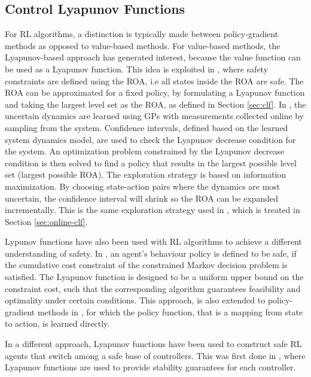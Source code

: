 \documentclass[3p,times,procedia]{elsarticle}
\begin{document}
\subsection{Control Lyapunov Functions}\label{sec:rl-clf}
For RL algorithms, a distinction is typically made between policy-gradient methods as opposed to value-based methods. For value-based methods, the Lyapunov-based approach has generated interest, because the value function can be used as a Lyapunov function. This idea is exploited in \cite{Berkenkamp2017}, where safety constraints are defined using the ROA, i.e all states inside the ROA are safe. The ROA can be approximated for a fixed policy, by formulating a Lyapunov function and taking the largest level set as the ROA, as defined in Section \ref{sec:clf}. In \cite{Berkenkamp2017}, the uncertain dynamics are learned using GPs with measurements collected online by sampling from the system. Confidence intervals, defined based on the learned system dynamics model, are used to check the Lyapunov decrease condition for the system. An optimization problem constrained by the Lyapunov decrease condition is then solved to find a policy that results in the largest possible level set (largest possible ROA). The exploration strategy is based on information maximization. By choosing state-action pairs where the dynamics are most uncertain, the confidence interval will shrink so the ROA can be expanded incrementally. This is the same exploration strategy used in \cite{Berkenkamp2016}, which is treated in Section \ref{sec:online-clf}. 


Lypunov functions have also been used with RL algorithms to achieve a different understanding of safety. In \cite{Chow2018}, an agent's behaviour policy is defined to be safe, if the cumulative cost constraint of the constrained Markov decision problem is satisfied. The Lyapunov function is designed to be a uniform upper bound on the constraint cost, such that the corresponding algorithm guarantees feasibility and optimality under certain conditions. This approach, is also extended to policy-gradient methods in \cite{Chow2019}, for which the policy function, that is a mapping from state to action, is learned directly.

In a different approach, Lyapunov functions have been used to construct safe RL agents that switch among a safe base of controllers. This was first done in \cite{Perkins2003}, where Lyapunov functions are used to provide stability guarantees for each controller. 
\end{document}
